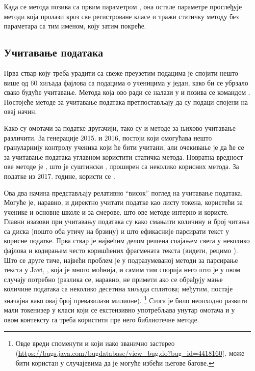 Када се  метода позива са првим параметром , она остале параметре прослеђује  методи која пролази кроз све регистроване класе и тражи статичку методу без параметара са тим именом, коју затим покреће.

\subsection{Учитавање података}

Прва ствар коју треба урадити са свеже преузетим подацима је спојити нешто више од 60 хиљада фајлова са подацима о ученицима у један, како би се убрзало свако будуће учитавање. Метода која ово ради се налази у  и позива се командом  . Постојеће методе за учитавање података претпостављају да су подаци спојени на овај начин.

Како су омотачи за податке другачији, тако су и методе за њихово учитавање различити. За генерације 2015. и 2016, постоји  који омогућава нешто грануларнију контролу ученика који ће бити учитани, али очекивање је да ће се за учитавање података углавном користити  статичка метода. Повратна вредност ове методе је , што је суштински , проширен са неколико корисних метода. За податке из 2017. године, користи се .

Ова два начина представљају релативно \enquote{висок} поглед на учитавање података. Могуће је, наравно, и директно учитати податке као листу токена, користећи  за ученике и основне школе и  за смерове, што ове методе интерно и користе. Главни изазови при учитавању података су како смањити количину и број читања са диска (пошто оба утичу на брзину) и што ефикасније парсирати текст у корисне податке. Прва ствар је највећим делом решена спајањем свега у неколико фајлова и кодирањем често коришћених фрагмената текста (видети, рецимо ). Што се друге тиче, највећи проблем је у подразумеваној методи за парсирање текста у Javi, , која је много моћнија, и самим тим спорија него што је у овом случају потребно (разлика се, наравно, не примети ако се обрађују мање количине података са неколико десетина хиљада сплитова; међутим, постаје значајна како овај број превазилази милионе). \footnote{Овде вреди споменути и  који иако званично застерео (\url{https://bugs.java.com/bugdatabase/view_bug.do?bug_id=4418160}), може бити користан у случајевима да је могуће избећи његове багове.} Стога је било неопходно развити мали токенизер у класи  који се екстензивно употребљава унутар омотача и у овом контексту га треба користити пре него библиотечне методе.

